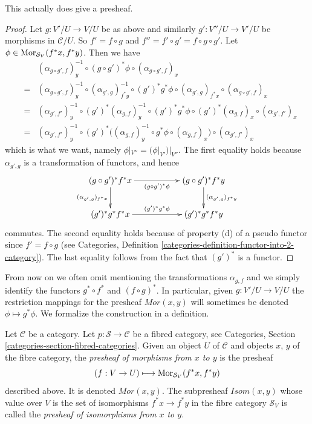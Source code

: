 \begin{lemma}
\label{lemma-painful}
This actually does give a presheaf.
\end{lemma}

\begin{proof}
Let $g : V'/U \to V/U$ be as above and similarly
$g' : V''/U \to V'/U$ be morphisms in $\mathcal{C}/U$.
So $f' = f \circ g$ and $f'' = f' \circ g' = f \circ g \circ g'$.
Let $\phi \in \mathop{\mathrm{Mor}}\nolimits_{\mathcal{S}_V}(f^\ast x, f^\ast y)$.
Then we have
\begin{eqnarray*}
& &
(\alpha_{g \circ g', f})_y^{-1} \circ
(g \circ g')^\ast \phi \circ
(\alpha_{g \circ g', f})_x
\\
& = &
(\alpha_{g \circ g', f})_y^{-1} \circ
(\alpha_{g', g})_{f^*y}^{-1} \circ
(g')^*g^\ast \phi \circ
(\alpha_{g', g})_{f^*x} \circ
(\alpha_{g \circ g', f})_x
\\
& = &
(\alpha_{g', f'})_y^{-1} \circ
(g')^*(\alpha_{g, f})_y^{-1} \circ
(g')^* g^\ast \phi \circ
(g')^*(\alpha_{g, f})_x
\circ
(\alpha_{g', f'})_x
\\
& = &
(\alpha_{g', f'})_y^{-1} \circ
(g')^*\Big(
(\alpha_{g, f})_y^{-1} \circ
g^\ast \phi \circ
(\alpha_{g, f})_x
\Big) \circ
(\alpha_{g', f'})_x
\end{eqnarray*}
which is what we want, namely $\phi|_{V''} = (\phi|_{V'})|_{V''}$.
The first equality holds because
$\alpha_{g', g}$ is a transformation of functors, and hence
$$
\xymatrix{
(g \circ g')^*f^*x
\ar[rr]_{(g \circ g')^\ast \phi}
\ar[d]_{(\alpha_{g', g})_{f^*x}} & &
(g \circ g')^*f^*y
\ar[d]^{(\alpha_{g', g})_{f^*y}} \\
(g')^*g^*f^*x
\ar[rr]^{(g')^*g^\ast \phi} & &
(g')^*g^*f^*y
}
$$
commutes. The second equality holds because of property (d) of
a pseudo functor since $f' = f \circ g$ (see
Categories, Definition \ref{categories-definition-functor-into-2-category}).
The last equality follows from the fact that $(g')^*$ is a functor.
\end{proof}

\noindent
From now on we often omit mentioning the transformations
$\alpha_{g, f}$ and we simply identify the functors
$g^* \circ f^*$ and $(f \circ g)^*$. In particular,
given $g : V'/U \to V/U$ the restriction
mappings for the presheaf $\mathit{Mor}(x, y)$
will sometimes be denoted $\phi \mapsto g^*\phi$.
We formalize the construction in a definition.

\begin{definition}
\label{definition-mor-presheaf}
Let $\mathcal{C}$ be a category.
Let $p : \mathcal{S} \to \mathcal{C}$ be a fibred category,
see Categories, Section \ref{categories-section-fibred-categories}.
Given an object $U$ of $\mathcal{C}$ and objects
$x$, $y$ of the fibre category, the {\it presheaf
of morphisms from $x$ to $y$} is the presheaf
$$
(f : V \to U) \longmapsto \mathop{\mathrm{Mor}}\nolimits_{\mathcal{S}_V}(f^*x, f^*y)
$$
described above. It is denoted $\mathit{Mor}(x, y)$.
The subpresheaf $\mathit{Isom}(x, y)$ whose value
over $V$ is the set of isomorphisms
$f^*x \to f^*y$ in the fibre category $\mathcal{S}_V$
is called the {\it presheaf of isomorphisms from $x$ to $y$}.
\end{definition}

